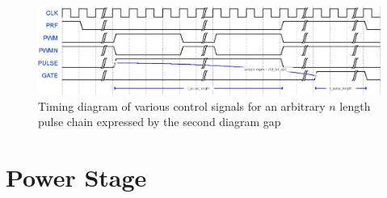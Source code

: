 \begin{figure}[htbp]
	\centering
	\includegraphics[width=\textwidth]{Figures/3_wavedrom.eps}
	\caption{Timing diagram of various control signals for an arbitrary $n$ length pulse chain expressed by the second diagram gap}
	\label{fig:3_pulse_timing_diagram}
\end{figure}

\section{Power Stage}
%
